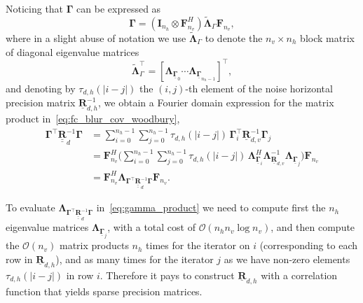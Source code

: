 \documentclass[12pt]{article}
\newcommand{\mycirc}[1] {\underline{\bm{#1}}}
\newcommand{\mybcirc}[1] {\underline{\underline{\bm{#1}}}}
\begin{document}
Noticing that $\bm{\Gamma}$ can be expressed as
\begin{equation}
    \bm{\Gamma} = (\bm{I}_{n_{h}} \otimes \bm{F}_{n_v}^H) \tilde{\bm{\Lambda}}_{\Gamma} \bm{F}_{n_v},
\end{equation}
where in a slight abuse of notation we use $\tilde{\bm{\Lambda}}_{\Gamma}$ to denote the $n_v \times n_h$ block matrix of diagonal eigenvalue matrices
\begin{equation}
    \tilde{\bm{\Lambda}}_{\Gamma}^{\top} = [\bm{\Lambda}_{\mycirc{\Gamma}_{0}} \cdots \bm{\Lambda}_{\mycirc{\Gamma}_{n_{h}-1}} ]^{\top},
\end{equation}
and denoting by $\tau_{d, h}(|i-j|)$ the $(i, j)$-th element of the noise horizontal precision matrix $\mycirc{R}_{d, h}^{-1}$, we obtain a Fourier domain expression for the matrix product in~\eqref{eq:fc_blur_cov_woodbury}, 
\begin{equation} \label{eq:gamma_product}
\begin{split}
    \bm{\Gamma}^{\top}\mybcirc{R}_d^{-1}\bm{\Gamma} 
    &= \sum_{i=0}^{n_h-1}\sum_{j=0}^{n_h-1} \tau_{d, h}(|i-j|)\,\bm{\Gamma}_i^{\top} \mycirc{R}_{d, v}^{-1} \bm{\Gamma}_j \\
    &= \bm{F}_{n_{v}}^H \bigl ( \sum_{i=0}^{n_h-1}\sum_{j=0}^{n_h-1} \tau_{d, h}(|i-j|)\, \bm{\Lambda}_{\mycirc{\Gamma}_{i}}^{H} \bm{\Lambda}_{\mycirc{R}_{d, v}}^{-1} \bm{\Lambda}_{\mycirc{\Gamma}_{j}}\bigr ) \bm{F}_{n_{v}} \\
    &= \bm{F}_{n_{v}}^H \bm{\Lambda}_{\bm{\Gamma}^{\top}\mybcirc{R}_d^{-1}\bm{\Gamma}} \bm{F}_{n_{v}}.
\end{split}
\end{equation}

To evaluate $\bm{\Lambda}_{\bm{\Gamma}^{\top}\mybcirc{R}_d^{-1}\bm{\Gamma}}$ in~\eqref{eq:gamma_product} we need to compute first the $n_h$ eigenvalue matrices $\bm{\Lambda}_{\mycirc{\Gamma}_{j}}$, with a total cost of $\mathcal{O}(n_h n_v \log n_v)$, and then compute the $\mathcal{O}(n_v)$ matrix products $n_h$ times for the iterator on $i$ (corresponding to each row in $\mycirc{R}_{d, h}$), and as many times for the iterator $j$ as we have non-zero elements $\tau_{d, h}(|i-j|)$ in row $i$. Therefore it pays to construct $\mycirc{R}_{d, h}$ with a correlation function that yields sparse precision matrices.
\end{document}
